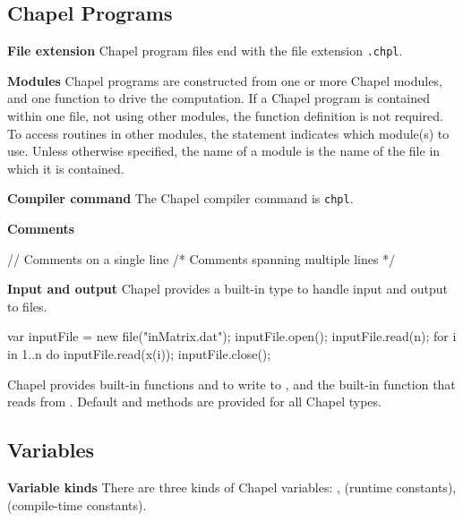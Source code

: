 \documentclass[landscape]{report}
\begin{document}
\setlength{\parindent}{0in}
\setlength{\parskip}{1mm plus2mm minus1mm}

\lstset{language=chapel}

{\footnotesize
\subsection*{Chapel Programs}

{\bf File extension} \newline
Chapel program files end with the file extension \verb+.chpl+.   

{\bf Modules} \newline
Chapel programs are constructed from one or more Chapel modules,
and one  function to drive the computation.
If a Chapel program is contained within
one file, not using other modules, the
 function definition is not required.
To access routines in other modules, the  statement
indicates which module(s) to use.
Unless otherwise specified, the name of a module is the name of
the file in which it is contained.

{\bf Compiler command} \newline
The Chapel compiler command is \verb+chpl+.  

{\bf Comments} 
\begin{chapel}
// Comments on a single line
/* Comments spanning
   multiple lines */
\end{chapel}

{\bf Input and output} \newline
Chapel provides a built-in  type to handle input and
output to files.  
\begin{chapel}
var inputFile = new file("inMatrix.dat");
inputFile.open();
inputFile.read(n);
for i in 1..n do inputFile.read(x(i));
inputFile.close();
\end{chapel}
Chapel provides built-in functions  and 
to write to , and the built-in function 
that reads from .
Default  and  methods are provided for all
Chapel types. 
\subsection*{Variables}
{\bf Variable kinds} \newline
There are three kinds of Chapel variables: ,
 (runtime constants),  (compile-time constants).

}
\end{document}
